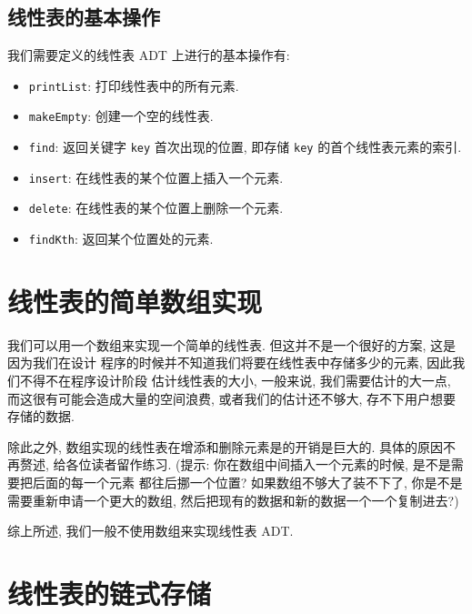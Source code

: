 \documentclass[10pt,UTF8]{book} %
\begin{document}
\subsection{线性表的基本操作}

我们需要定义的线性表 ADT 上进行的基本操作有:
\begin{itemize}[itemsep=0pt]
    \item \lstinline|printList|: 打印线性表中的所有元素.
    \item \lstinline|makeEmpty|: 创建一个空的线性表.
    \item \lstinline|find|: 返回关键字 \lstinline|key| 首次出现的位置, 即存储 \lstinline|key| 的首个线性表元素的索引.
    \item \lstinline|insert|: 在线性表的某个位置上插入一个元素.
    \item \lstinline|delete|: 在线性表的某个位置上删除一个元素.
    \item \lstinline|findKth|: 返回某个位置处的元素.
\end{itemize}

\section{线性表的简单数组实现}

我们可以用一个数组来实现一个简单的线性表. 但这并不是一个很好的方案, 这是因为我们在设计
程序的时候并不知道我们将要在线性表中存储多少的元素, 因此我们不得不在程序设计阶段
估计线性表的大小, 一般来说, 我们需要估计的大一点, 而这很有可能会造成大量的空间浪费,
或者我们的估计还不够大, 存不下用户想要存储的数据.

除此之外, 数组实现的线性表在增添和删除元素是的开销是巨大的. 具体的原因不再赘述,
给各位读者留作练习. (提示: 你在数组中间插入一个元素的时候, 是不是需要把后面的每一个元素
都往后挪一个位置? 如果数组不够大了装不下了, 你是不是需要重新申请一个更大的数组,
然后把现有的数据和新的数据一个一个复制进去?)

综上所述, 我们一般不使用数组来实现线性表 ADT.

\section{线性表的链式存储}
\end{document}
